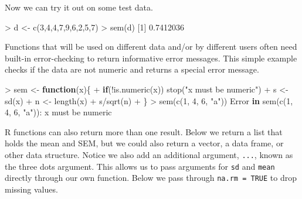 \documentclass[
]{book}
\newenvironment{Shaded}{\begin{snugshade}}{\end{snugshade}}
\newcommand{\ControlFlowTok}[1]{\textcolor[rgb]{0.13,0.29,0.53}{\textbf{#1}}}
\newcommand{\DecValTok}[1]{\textcolor[rgb]{0.00,0.00,0.81}{#1}}
\newcommand{\FloatTok}[1]{\textcolor[rgb]{0.00,0.00,0.81}{#1}}
\newcommand{\FunctionTok}[1]{\textcolor[rgb]{0.00,0.00,0.00}{#1}}
\newcommand{\NormalTok}[1]{#1}
\newcommand{\OtherTok}[1]{\textcolor[rgb]{0.56,0.35,0.01}{#1}}
\newcommand{\SpecialCharTok}[1]{\textcolor[rgb]{0.00,0.00,0.00}{#1}}
\newcommand{\StringTok}[1]{\textcolor[rgb]{0.31,0.60,0.02}{#1}}
\begin{document}
Now we can try it out on some test data.

\begin{Shaded}
\begin{Highlighting}[]
\SpecialCharTok{\textgreater{}}\NormalTok{ d }\OtherTok{\textless{}{-}} \FunctionTok{c}\NormalTok{(}\DecValTok{3}\NormalTok{,}\DecValTok{4}\NormalTok{,}\DecValTok{4}\NormalTok{,}\DecValTok{7}\NormalTok{,}\DecValTok{9}\NormalTok{,}\DecValTok{6}\NormalTok{,}\DecValTok{2}\NormalTok{,}\DecValTok{5}\NormalTok{,}\DecValTok{7}\NormalTok{)}
\SpecialCharTok{\textgreater{}} \FunctionTok{sem}\NormalTok{(d)}
\NormalTok{[}\DecValTok{1}\NormalTok{] }\FloatTok{0.7412036}
\end{Highlighting}
\end{Shaded}

Functions that will be used on different data and/or by different users often need built-in error-checking to return informative error messages. This simple example checks if the data are not numeric and returns a special error message.

\begin{Shaded}
\begin{Highlighting}[]
\SpecialCharTok{\textgreater{}}\NormalTok{ sem }\OtherTok{\textless{}{-}} \ControlFlowTok{function}\NormalTok{(x)\{}
\SpecialCharTok{+}   \ControlFlowTok{if}\NormalTok{(}\SpecialCharTok{!}\FunctionTok{is.numeric}\NormalTok{(x)) }\FunctionTok{stop}\NormalTok{(}\StringTok{"x must be numeric"}\NormalTok{)}
\SpecialCharTok{+}\NormalTok{   s }\OtherTok{\textless{}{-}} \FunctionTok{sd}\NormalTok{(x)}
\SpecialCharTok{+}\NormalTok{   n }\OtherTok{\textless{}{-}} \FunctionTok{length}\NormalTok{(x)}
\SpecialCharTok{+}\NormalTok{   s}\SpecialCharTok{/}\FunctionTok{sqrt}\NormalTok{(n)}
\SpecialCharTok{+}\NormalTok{ \}}
\SpecialCharTok{\textgreater{}} \FunctionTok{sem}\NormalTok{(}\FunctionTok{c}\NormalTok{(}\DecValTok{1}\NormalTok{, }\DecValTok{4}\NormalTok{, }\DecValTok{6}\NormalTok{, }\StringTok{"a"}\NormalTok{))}
\NormalTok{Error }\ControlFlowTok{in} \FunctionTok{sem}\NormalTok{(}\FunctionTok{c}\NormalTok{(}\DecValTok{1}\NormalTok{, }\DecValTok{4}\NormalTok{, }\DecValTok{6}\NormalTok{, }\StringTok{"a"}\NormalTok{))}\SpecialCharTok{:}\NormalTok{ x must be numeric}
\end{Highlighting}
\end{Shaded}

R functions can also return more than one result. Below we return a list that holds the mean and SEM, but we could also return a vector, a data frame, or other data structure. Notice we also add an additional argument, \texttt{...}, known as the three dots argument. This allows us to pass arguments for \texttt{sd} and \texttt{mean} directly through our own function. Below we pass through \texttt{na.rm\ =\ TRUE} to drop missing values.
\end{document}
